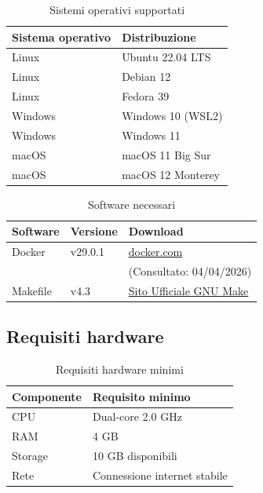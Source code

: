 \documentclass[a4paper,10pt]{article}
\begin{document}
\begin{table}[H]
\centering
\renewcommand{\arraystretch}{1.3}
\begin{tabular}{|l|l|}
\hline
\textbf{Sistema operativo} & \textbf{Distribuzione} \\ \hline

Linux & Ubuntu 22.04 LTS \\ 
Linux & Debian 12 \\ 
Linux & Fedora 39 \\ 

Windows & Windows 10 (WSL2) \\ 
Windows & Windows 11 \\ 

macOS & macOS 11 Big Sur \\ 
macOS & macOS 12 Monterey \\ \hline

\end{tabular}
\caption{Sistemi operativi supportati}
\end{table}

\begin{table}[H]
\centering
\renewcommand{\arraystretch}{1.3}
\begin{tabular}{|l|l|l|}
\hline
\textbf{Software} & \textbf{Versione} & \textbf{Download} \\ \hline
Docker & v29.0.1 & \href{https://www.docker.com}{docker.com} \\ 
& & \small (Consultato: 04/04/2026) \\ \hline
Makefile & v4.3 & \href{https://www.gnu.org/software/make/}{Sito Ufficiale GNU Make} \\ \hline


\end{tabular}
\caption{Software necessari}
\end{table}

\subsection{Requisiti hardware}
\begin{table}[H]
\centering
\renewcommand{\arraystretch}{1.3}
\begin{tabular}{|l|l|}
\hline
\textbf{Componente} & \textbf{Requisito minimo} \\ \hline

CPU & Dual-core 2.0 GHz \\ 
RAM & 4 GB \\ 
Storage & 10 GB disponibili \\ 
Rete & Connessione internet stabile \\ \hline

\end{tabular}
\caption{Requisiti hardware minimi}
\end{table}
\end{document}
